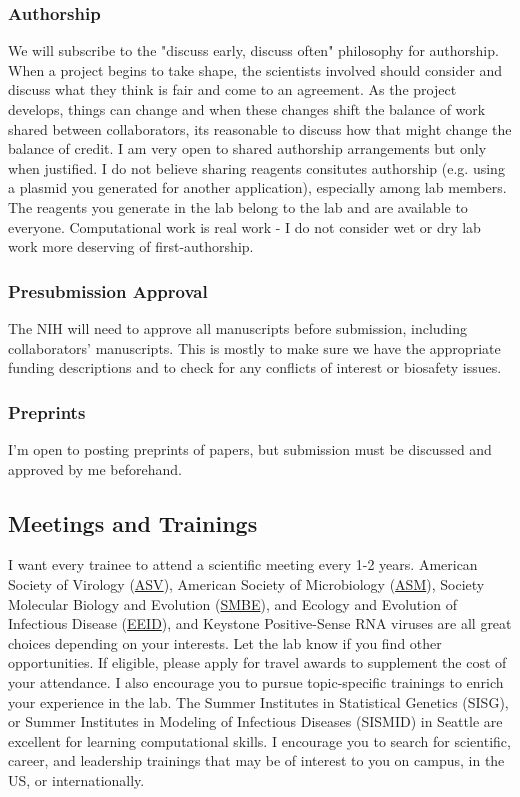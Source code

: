 \documentclass[10pt, letterpaper, twocolumn]{article} %
\begin{document}
\subsubsection{Authorship}
We will subscribe to the "discuss early, discuss often" philosophy for authorship. When a project begins to take shape, the scientists involved should consider and discuss what they think is fair and come to an agreement. As the project develops, things can change and when these changes shift the balance of work shared between collaborators, its reasonable to discuss how that might change the balance of credit. I am very open to shared authorship arrangements but only when justified. I do not believe sharing reagents consitutes authorship (e.g. using a plasmid you generated for another application), especially among lab members. The reagents you generate in the lab belong to the lab and are available to everyone. Computational work is real work - I do not consider wet or dry lab work more deserving of first-authorship.

\subsubsection{Presubmission Approval}
The NIH will need to approve all manuscripts before submission, including collaborators' manuscripts. This is mostly to make sure we have the appropriate funding descriptions and to check for any conflicts of interest or biosafety issues.

\subsubsection{Preprints}
I'm open to posting preprints of papers, but submission must be discussed and approved by me beforehand.

\subsection{Meetings and Trainings}
I want every trainee to attend a scientific meeting every 1-2 years. American Society of Virology (\href{https://asv.org/}{ASV}), American Society of Microbiology (\href{https://asm.org/}{ASM}), Society Molecular Biology and Evolution (\href{https://smbe.org/smbe/}{SMBE}), and Ecology and Evolution of Infectious Disease (\href{https://www.eeidconference2021.org/}{EEID}), and Keystone Positive-Sense RNA viruses are all great choices depending on your interests. Let the lab know if you find other opportunities. If eligible, please apply for travel awards to supplement the cost of your attendance.\newline
I also encourage you to pursue topic-specific trainings to enrich your experience in the lab. The Summer Institutes in Statistical Genetics (SISG), or Summer Institutes in Modeling of Infectious Diseases (SISMID) in Seattle are excellent for learning computational skills. I encourage you to search for scientific, career, and leadership trainings that may be of interest to you on campus, in the US, or internationally.
\end{document}
